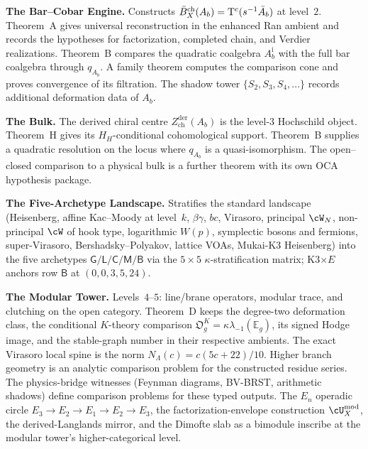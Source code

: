 \medskip

\noindent\textbf{The Bar--Cobar Engine.}\enspace
Constructs $\bar{B}^{\mathrm{ch}}_X(A_b) = \mathrm{T}^c(s^{-1}\bar A_b)$ at
level~$2$.  Theorem~A gives universal reconstruction in the enhanced
Ran ambient and records the hypotheses for factorization, completed
chain, and Verdier realizations.  Theorem~B compares the quadratic
coalgebra $A_b^{\mathrm i}$ with the full bar coalgebra through
$q_{A_b}$.  A family theorem computes the comparison cone and proves
convergence of its filtration.  The shadow tower
$\{S_2,S_3,S_4,\ldots\}$ records additional deformation data of
$A_b$.

\medskip

\noindent\textbf{The Bulk.}\enspace
The derived chiral centre
$Z^{\mathrm{der}}_{\mathrm{ch}}(A_b)$ is the level-$3$ Hochschild
object.  Theorem~H gives its $H_H$-conditional cohomological support.
Theorem~B supplies a quadratic resolution on the locus where
$q_{A_b}$ is a quasi-isomorphism.  The open--closed comparison to a
physical bulk is a further theorem with its own OCA hypothesis
package.

\medskip

\noindent\textbf{The Five-Archetype Landscape.}\enspace
Stratifies the standard landscape (Heisenberg, affine Kac--Moody at
level~$k$, $\beta\gamma$, $bc$, Virasoro, principal $\cW_N$,
non-principal $\cW$ of hook type, logarithmic $W(p)$, symplectic
bosons and fermions, super-Virasoro, Bershadsky--Polyakov, lattice
VOAs, Mukai-K3 Heisenberg) into the five archetypes
$\mathsf G / \mathsf L / \mathsf C / \mathsf M / \mathsf B$ via the
$5{\times}5$ $\kappa$-stratification matrix; K3$\times E$ anchors
row $\mathsf B$ at $(0, 0, 3, 5, 24)$.

\medskip

\noindent\textbf{The Modular Tower.}\enspace
Levels~$4$--$5$: line/brane operators, modular trace, and clutching
on the open category.  Theorem~D keeps the degree-two deformation
class, the conditional $K$-theory comparison
$\mathfrak O_g^K=\kappa\lambda_{-1}(\mathbb E_g)$, its signed Hodge
image, and the stable-graph number in their respective ambients.  The
exact Virasoro local spine is the norm
$N_\Lambda(c)=c(5c+22)/10$.  Higher branch geometry is an analytic
comparison problem for the constructed residue series.  The
physics-bridge witnesses (Feynman diagrams, BV-BRST, arithmetic
shadows) define comparison problems for these typed outputs. The
$E_n$ operadic circle $E_3 \to E_2 \to E_1 \to E_2 \to E_3$, the
factorization-envelope construction $\cU^{\mathrm{mod}}_X$, the
derived-Langlands mirror, and the Dimofte slab as a bimodule
inscribe at the modular tower's higher-categorical level.

